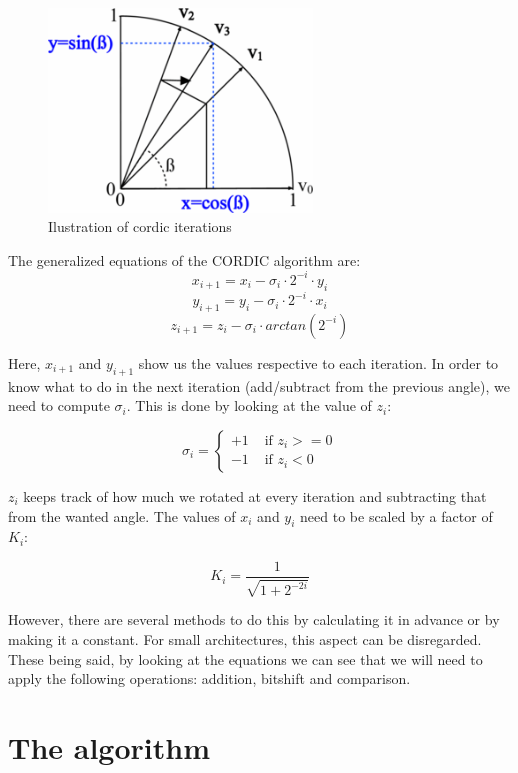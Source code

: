 \documentclass[12pt, a4paper,oneside]{article}
\begin{document}
\begin{figure}[h]
	\centering
	\includegraphics[width = 7cm]{cordic_iterations.png}
	\caption{Ilustration of cordic iterations}
	\label{fig:cordic_iterations}
\end{figure}

The generalized equations of the CORDIC algorithm are:
\[ x_{i+1} = x_i - \sigma_i \cdot 2^{-i} \cdot y_i \]
\[ y_{i+1} = y_i - \sigma_i \cdot 2^{-i} \cdot x_i \]
\[ z_{i+1} = z_i - \sigma_i \cdot arctan(2^{-i}) \]


Here, $x_{i+1}$ and $y_{i+1}$ show us the values respective to each iteration.
In order to know what to do in the next iteration (add/subtract from the previous
angle), we need to compute $\sigma_i$. This is done by looking at the value of 
$z_i$:

$$
\sigma_i = \left\{ \begin{array}{rl}
 +1 &\mbox{ if $z_i>=0$} \\
 -1 &\mbox{ if $z_i<0$}
       \end{array} \right.
$$

$z_i$ keeps track of how much we rotated at every iteration and subtracting that 
from the wanted angle.
The values of $x_i$ and $y_i$ need to be scaled by a factor of $K_i$:

$$K_i = \frac{1}{\sqrt{1 + 2^{-2i}}}$$

However, there are several methods to do this by calculating it in advance or by 
making it a constant. For small architectures, this aspect can be disregarded.
\\
These being said, by looking at the equations we can see that we will need 
to apply the following operations: addition, bitshift and comparison.

\section{The algorithm}
\end{document}
